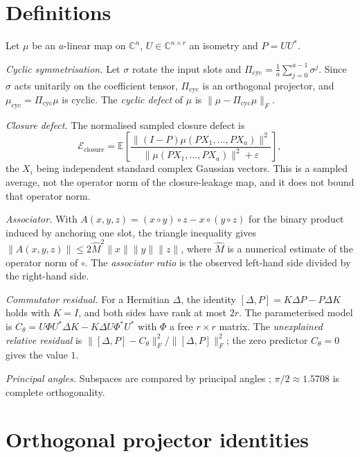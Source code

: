 \documentclass[11pt]{amsart}
\newcommand{\norm}[1]{\lVert#1\rVert}
\theoremstyle{remark}
\begin{document}
\section{Definitions}
\label{sec:definitions}

Let $\mu$ be an $a$-linear map on $\mathbb C^{n}$, $U\in\mathbb C^{n\times r}$ an isometry
and $P=UU^{*}$.

\emph{Cyclic symmetrisation.} Let $\sigma$ rotate the input slots and
$\Pi_{\mathrm{cyc}}=\frac1a\sum_{j=0}^{a-1}\sigma^{j}$. Since $\sigma$ acts unitarily on
the coefficient tensor, $\Pi_{\mathrm{cyc}}$ is an orthogonal projector, and
$\mu_{\mathrm{cyc}}=\Pi_{\mathrm{cyc}}\mu$ is cyclic. The \emph{cyclic defect} of $\mu$ is
$\norm{\mu-\Pi_{\mathrm{cyc}}\mu}_F$.

\emph{Closure defect.} The normalised sampled closure defect is
\[
 \mathcal E_{\mathrm{closure}}
 =\mathbb E\left[\frac{\norm{(I-P)\mu(PX_1,\ldots,PX_a)}^{2}}
 {\norm{\mu(PX_1,\ldots,PX_a)}^{2}+\varepsilon}\right],
\]
the $X_i$ being independent standard complex Gaussian vectors. This is a sampled average,
not the operator norm of the closure-leakage map, and it does not bound that operator norm.

\emph{Associator.} With $A(x,y,z)=(x\circ y)\circ z-x\circ(y\circ z)$ for the binary
product induced by anchoring one slot, the triangle inequality gives
$\norm{A(x,y,z)}\le2\widehat M^{2}\norm{x}\norm{y}\norm{z}$, where $\widehat M$ is a
numerical estimate of the operator norm of $\circ$. The \emph{associator ratio} is the
observed left-hand side divided by the right-hand side.

\emph{Commutator residual.} For a Hermitian $\Delta$, the identity
$[\Delta,P]=K\Delta P-P\Delta K$ holds with $K=I$, and both sides have rank at most $2r$.
The parameterised model is $C_\theta=U\Phi U^{*}\Delta K-K\Delta U\Phi^{*}U^{*}$ with
$\Phi$ a free $r\times r$ matrix. The \emph{unexplained relative residual} is
$\norm{[\Delta,P]-C_\theta}_F^{2}/\norm{[\Delta,P]}_F^{2}$; the zero predictor
$C_\theta=0$ gives the value $1$.

\emph{Principal angles.} Subspaces are compared by principal angles
\cite{BjorckGolub1973,GolubVanLoan2013}; $\pi/2\approx1.5708$ is complete orthogonality.

\section{Orthogonal projector identities}
\label{sec:projector}
\end{document}
